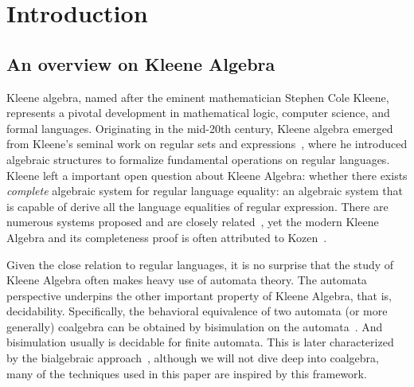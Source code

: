 \chapter{Introduction}
\label{chapter:introduction}
\thispagestyle{myheadings}

\section{An overview on Kleene Algebra}
\label{sec:history}

Kleene algebra, named after the eminent mathematician Stephen Cole Kleene, represents a pivotal development in mathematical logic, computer science, and formal languages. 
Originating in the mid-20th century, Kleene algebra emerged from Kleene's seminal work on regular sets and expressions~\cite{Kleene_1956}, where he introduced algebraic structures to formalize fundamental operations on regular languages. 
Kleene left a important open question about Kleene Algebra: whether there exists \emph{complete} algebraic system for regular language equality: an algebraic system that is capable of derive all the language equalities of regular expression.
There are numerous systems proposed and are closely related~\cite{Kozen_1990}, yet the modern Kleene Algebra and its completeness proof is often attributed to Kozen~\cite{Kozen_2001,Kozen_1994}.

Given the close relation to regular languages, it is no surprise that the study of Kleene Algebra often makes heavy use of automata theory.
The automata perspective underpins the other important property of Kleene Algebra, that is, decidability.
Specifically, the behavioral equivalence of two automata (or more generally) coalgebra can be obtained by bisimulation on the automata~\cite{rutten_UniversalCoalgebraTheory_2000}.
And bisimulation usually is decidable for finite automata.
This is later characterized by the bialgebraic approach~\cite{jacobs_BialgebraicReviewDeterministic_2006}, although we will not dive deep into coalgebra, many of the techniques used in this paper are inspired by this framework.

